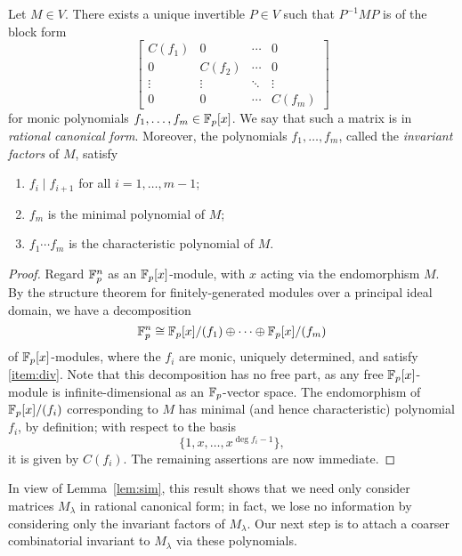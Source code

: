 \begin{thm}
\label{thm:rcf}
Let $M\in V$. There exists a unique invertible $P\in V$ such that $P^{-1}MP$ is of the block form
\begin{equation}
\label{eqn:rcf}
\begin{bmatrix}
C(f_1)&0&\cdots&0\\
0&C(f_2)&\cdots&0\\
\vdots&\vdots&\ddots&\vdots\\
0&0&\cdots&C(f_m)
\end{bmatrix}
\end{equation}
for monic polynomials $f_1,\ldots,f_m\in\mathbb{F}_p[x]$. We say that such a matrix is in \emph{rational canonical form}. Moreover, the polynomials $f_1,\ldots,f_m$, called the \emph{invariant factors} of $M$, satisfy
\begin{enumerate}
\item $f_i\mid f_{i+1}$ for all $i=1,\ldots,m-1$;\label{item:div}
\item $f_m$ is the minimal polynomial of $M$;\label{item:min}
\item $f_1\cdots f_m$ is the characteristic polynomial of $M$.\label{item:char}
\end{enumerate}
\end{thm}
\begin{proof}
Regard $\mathbb{F}_p^n$ as an $\mathbb{F}_p[x]$-module, with $x$ acting via the endomorphism $M$. By the structure theorem for finitely-generated modules over a principal ideal domain, we have a decomposition
\begin{equation*}
\mathbb{F}_p^n\cong\mathbb{F}_p[x]/(f_1)\oplus\cdots\oplus\mathbb{F}_p[x]/(f_m)
\end{equation*}
of $\mathbb{F}_p[x]$-modules, where the $f_i$ are monic, uniquely determined, and satisfy \eqref{item:div}. Note that this decomposition has no free part, as any free $\mathbb{F}_p[x]$-module is infinite-dimensional as an $\mathbb{F}_p$-vector space. The endomorphism of $\mathbb{F}_p[x]/(f_i)$ corresponding to $M$ has minimal (and hence characteristic) polynomial $f_i$, by definition; with respect to the basis
\begin{equation*}
\{1,x,\ldots,x^{\deg f_i-1}\},
\end{equation*}
it is given by $C(f_i)$. The remaining assertions are now immediate.
\end{proof}
In view of Lemma~\ref{lem:sim}, this result shows that we need only consider matrices $M_\lambda$ in rational canonical form; in fact, we lose no information by considering only the invariant factors of $M_\lambda$. Our next step is to attach a coarser combinatorial invariant to $M_\lambda$ via these polynomials.
